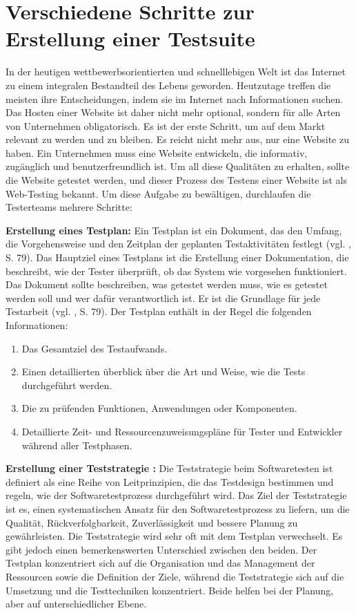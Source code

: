 \section{Verschiedene Schritte zur Erstellung einer Testsuite}\label{sec:verschiedene-schritte-zur-erstellung-einer-testsuite}

In der heutigen wettbewerbsorientierten und schnelllebigen
Welt ist das Internet zu einem integralen Bestandteil des Lebens
geworden. Heutzutage treffen die meisten ihre Entscheidungen,
indem sie im Internet nach Informationen suchen. Das Hosten einer
Website ist daher nicht mehr optional, sondern f\"ur alle Arten von
Unternehmen obligatorisch. Es ist der erste Schritt, um auf dem
Markt relevant zu werden und zu bleiben. Es reicht nicht mehr aus,
nur eine Website zu haben. Ein Unternehmen muss eine Website
entwickeln, die informativ, zug\"anglich und benutzerfreundlich ist.
Um all diese Qualit\"aten zu erhalten, sollte die Website getestet
werden, und dieser Prozess des Testens einer Website ist als Web-Testing
bekannt. Um diese Aufgabe zu bew\"altigen,
durchlaufen die Testerteams mehrere Schritte:

\textbf{Erstellung eines Testplan:} Ein Testplan ist ein Dokument, das den
Umfang, die Vorgehensweise und den Zeitplan der geplanten Testaktivit\"aten
festlegt (vgl. \cite{shultz2011software}, S. 79). Das Hauptziel eines Testplans
ist die Erstellung einer Dokumentation, die beschreibt, wie der Tester
\"uberpr\"uft, ob das System wie vorgesehen funktioniert. Das Dokument sollte
beschreiben, was getestet werden muss, wie es getestet werden soll und wer
daf\"ur verantwortlich ist. Er ist die Grundlage f\"ur jede Testarbeit
(vgl. \cite{shultz2011software}, S. 79). Der Testplan enth\"alt in der Regel die
folgenden Informationen:

\begin{enumerate}
    \item Das Gesamtziel des Testaufwands.
    \item Einen detaillierten \"uberblick \"uber die Art und Weise, wie die Tests
    durchgef\"uhrt werden.
    \item Die zu pr\"ufenden Funktionen, Anwendungen oder Komponenten.
    \item Detaillierte Zeit- und Ressourcenzuweisungspl\"ane f\"ur Tester und
    Entwickler w\"ahrend aller Testphasen.
\end{enumerate}

\textbf{Erstellung einer Teststrategie :} Die Teststrategie beim Softwaretesten
ist definiert als eine Reihe von Leitprinzipien, die das Testdesign
bestimmen und regeln, wie der Softwaretestprozess durchgef\"uhrt wird. Das Ziel
der Teststrategie ist es, einen systematischen Ansatz f\"ur den
Softwaretestprozess zu liefern, um die Qualit\"at, R\"uckverfolgbarkeit,
Zuverl\"assigkeit und bessere Planung zu gew\"ahrleisten. Die
Teststrategie wird sehr oft mit dem Testplan verwechselt. Es gibt jedoch einen
bemerkenswerten Unterschied zwischen den beiden. Der Testplan konzentriert
sich auf die Organisation und das Management der Ressourcen sowie die
Definition der Ziele, w\"ahrend die Teststrategie sich auf die Umsetzung und die
Testtechniken konzentriert. Beide helfen bei der Planung, aber auf
unterschiedlicher Ebene.

